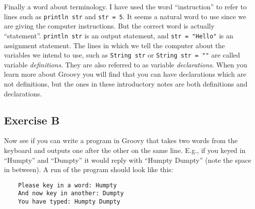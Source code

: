 Finally a word about terminology.  I have used the word ``instruction''
to refer to lines such as \verb!println str! and \verb!str = 5!.
It seems a natural word to use since we are giving the computer instructions.
But the correct word is actually ``statement''.  \verb!println str! is
an output statement, and \verb!str = "Hello"! is an assignment statement.
The lines in which we tell the computer about the variables we intend to
use, such as \verb!String str! or \verb!String str = ""! are called
variable \emph{definitions}.  They are also referred to as 
variable \emph{declarations}.  When you learn more about Groovy you will
find that you can have declarations which are not definitions, but the
ones in these introductory notes are both definitions and declarations.

\subsection*{Exercise B}

Now see if you can write a program in Groovy that takes
two words from the keyboard and outputs one after the other on the same line. 
E.g., if you keyed in ``Humpty'' and ``Dumpty'' 
it would reply with ``Humpty Dumpty'' (note the space in between).
A run of the program should look like this:

\begin{Verbatim}
    Please key in a word: Humpty
    And now key in another: Dumpty
    You have typed: Humpty Dumpty
\end{Verbatim}


 	


